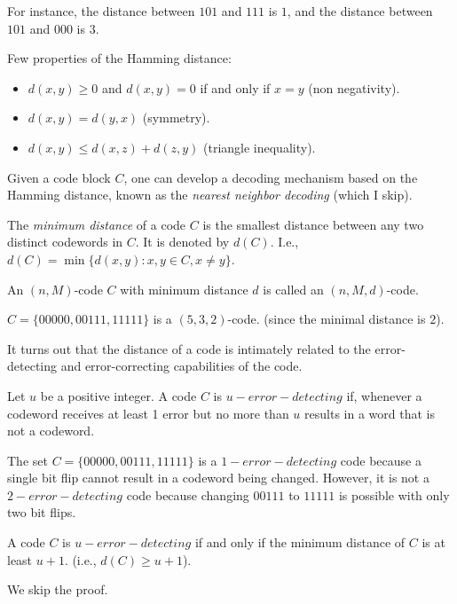 For instance, the distance between $101$ and $111$ is $1$, 
and the distance between $101$ and $000$ is $3$.

Few properties of the Hamming distance:
\begin{itemize}
    \item $d(x,y)\ge0$ and $d(x,y)=0$ if and only if $x=y$ (non negativity).
    \item $d(x,y)=d(y,x)$ (symmetry).
    \item $d(x,y)\le d(x,z)+d(z,y)$ (triangle inequality).
\end{itemize}

Given a code block $C$, one can develop a decoding mechanism
based on the Hamming distance, known as the \emph{nearest neighbor decoding} (which I skip).


\begin{definition}
    The \emph{minimum distance} of a code $C$ is the smallest distance between any two distinct codewords in $C$.
    It is denoted by $d(C)$.
    I.e., $d(C) = \min\{d(x,y): x,y\in C, x\neq y\}$.
\end{definition}

\begin{definition}
    An $(n,M)$-code $C$ with minimum distance $d$ is called an $(n,M,d)$-code.
\end{definition}


\begin{example}
    $C=\{00000, 00111, 11111\}$ is a $(5,3,2)$-code. (since the minimal distance is $2$).
\end{example}


It turns out that the distance of a code is intimately related to the error-
detecting and error-correcting capabilities of the code.

\begin{definition}
Let $u$ be a positive integer. A code $C$ is $u-error-detecting$ 
if, whenever a codeword receives at least 1 error but no more than $u$ results
in a word that is not a codeword.
\end{definition}

\begin{example}
    The set $C=\{00000, 00111, 11111\}$ is a $1-error-detecting$ code because a single bit flip
    cannot result in a codeword being changed. 
    However, it is not a $2-error-detecting$ code because changing $00111$ to $11111$ is possible with 
    only two bit flips.
\end{example}

\begin{theorem}
    A code $C$ is $u-error-detecting$ if and only if the minimum distance of $C$ is at least $u+1$.
    (i.e., $d(C)\ge u+1$).
\end{theorem}
We skip the proof.


